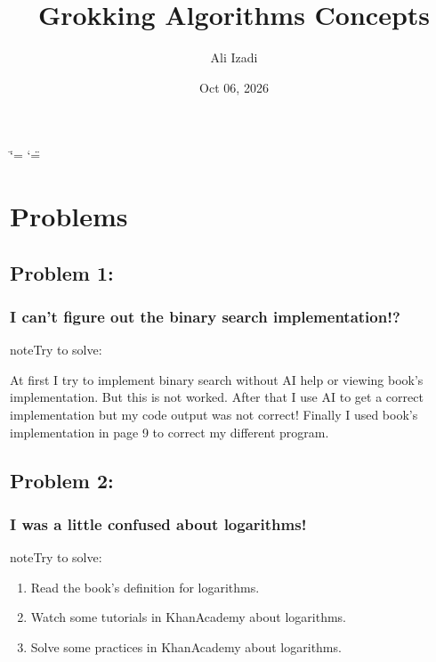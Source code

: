 \documentclass[letterpaper,10pt,english]{sphinxmanual}
\title{Grokking Algorithms Concepts}
\date{Oct 06, 2026}
\author{Ali Izadi}
\begin{document}
\ifdefined\shorthandoff
  \ifnum\catcode`\=\string=\active\shorthandoff{=}\fi
  \ifnum\catcode`\"=\active{}\fi
\fi

\pagestyle{empty}
\sphinxmaketitle
\pagestyle{plain}
\sphinxtableofcontents
\pagestyle{normal}
\label{\detokenize{index::doc}}



\chapter{Problems}
\label{\detokenize{index:problems}}

\section{Problem 1:}
\label{\detokenize{index:problem-1}}

\subsection{I can’t figure out the binary search implementation!?}
\label{\detokenize{index:i-can-t-figure-out-the-binary-search-implementation}}
\begin{sphinxadmonition}{note}{Try to solve:}

\sphinxAtStartPar
At first I try to implement binary search without AI help or viewing book’s implementation.
But this is not worked. After that I use AI to get a correct implementation but my code output
was not correct! Finally I used book’s implementation in page 9 to correct my different program.
\end{sphinxadmonition}


\section{Problem 2:}
\label{\detokenize{index:problem-2}}

\subsection{I was a little confused about logarithms!}
\label{\detokenize{index:i-was-a-little-confused-about-logarithms}}
\begin{sphinxadmonition}{note}{Try to solve:}
\begin{enumerate}
%
\item {} 
\sphinxAtStartPar
Read the book’s definition for logarithms.

\item {} 
\sphinxAtStartPar
Watch some tutorials in KhanAcademy about logarithms.

\item {} 
\sphinxAtStartPar
Solve some practices in KhanAcademy about logarithms.

\end{enumerate}
\end{sphinxadmonition}
\end{document}
